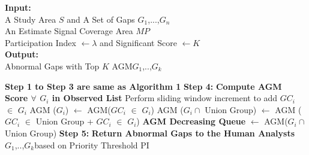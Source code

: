 \documentclass[acmsmall]{acmart}
\begin{document}
\begin{algorithm}
\caption{Dynamic Region Merge Algorithm}
\label{DRM}

\footnotesize
\begin{flushleft}
\hspace*{\algorithmicindent}\textbf{Input:}\\
\hspace*{\algorithmicindent} A Study Area $S$ and A Set of Gaps \lbrack$G_{1}$,...,$G_{n}$\rbrack\\
\hspace*{\algorithmicindent} An Estimate Signal Coverage Area $MP$\\
\hspace*{\algorithmicindent} Participation Index $\leftarrow \lambda$ and Significant Score $\leftarrow K$\\
\hspace*{\algorithmicindent}\textbf{Output:}\\
\hspace*{\algorithmicindent} Abnormal Gaps with Top $K$ AGM\lbrack$G_{1}$,..,$G_{k}$\rbrack
\footnotesize
\end{flushleft}
\begin{algorithmic}[1]
    \Procedure{:}{}
    \State \textbf{Step 1 to Step 3 are same as Algorithm 1}
    \State \textbf{Step 4:} \textbf{Compute AGM Score $\forall$ $G_{i}$ in Observed List}
        \State Perform sliding window increment to add $GC_{i}$ $\in$ $G_{i}$
        \State AGM ($G_{i}$) $\leftarrow$ AGM($GC_{i}$ $\in$ $G_{i}$)
        \State AGM ($G_{i} \cap$ Union Group) $\leftarrow$ AGM ($GC_{i}$ $\in$ Union Group + $GC_{i}$ $\in$ $G_{i}$)
                \State \textbf{AGM Decreasing Queue} $\leftarrow$ AGM($G_{i} \cap$ Union Group)
            \EndIf
        \EndIf
        \EndFor
    \State \textbf{Step 5:} \textbf{Return Abnormal Gaps to the Human Analysts}
    \State \Return \lbrack$G_{1}$,..,$G_{k}$\rbrack based on Priority Threshold PI
\EndProcedure
\end{algorithmic}
\end{algorithm}
\end{document}
